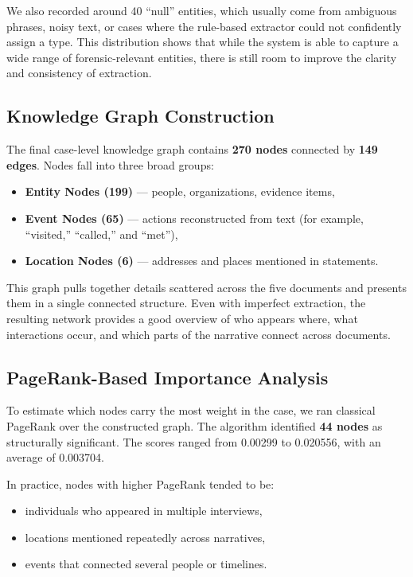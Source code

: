 \documentclass{ieeeaccess}
\begin{document}
We also recorded around 40 ``null'' entities, which usually come from ambiguous phrases, noisy text, or cases where the rule-based extractor could not confidently assign a type. This distribution shows that while the system is able to capture a wide range of forensic-relevant entities, there is still room to improve the clarity and consistency of extraction.

\subsection{Knowledge Graph Construction}
The final case-level knowledge graph contains \textbf{270 nodes} connected by \textbf{149 edges}. Nodes fall into three broad groups:
\begin{itemize}
\item \textbf{Entity Nodes (199)} --- people, organizations, evidence items,
\item \textbf{Event Nodes (65)} --- actions reconstructed from text (for example, ``visited,'' ``called,'' and ``met''),
\item \textbf{Location Nodes (6)} --- addresses and places mentioned in statements.
\end{itemize}

This graph pulls together details scattered across the five documents and presents them in a single connected structure. Even with imperfect extraction, the resulting network provides a good overview of who appears where, what interactions occur, and which parts of the narrative connect across documents.

\subsection{PageRank-Based Importance Analysis}
To estimate which nodes carry the most weight in the case, we ran classical PageRank over the constructed graph. The algorithm identified \textbf{44 nodes} as structurally significant. The scores ranged from 0.00299 to 0.020556, with an average of 0.003704.

In practice, nodes with higher PageRank tended to be:
\begin{itemize}
\item individuals who appeared in multiple interviews,
\item locations mentioned repeatedly across narratives,
\item events that connected several people or timelines.
\end{itemize}
\end{document}
